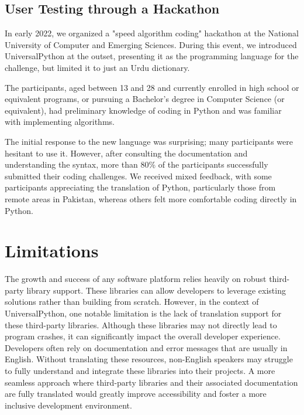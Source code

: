 \documentclass[conference]{IEEEtran}
\begin{document}
\subsection{User Testing through a Hackathon}

In early 2022, we organized a "speed algorithm coding" hackathon at the National University of Computer and Emerging Sciences. During this event, we introduced UniversalPython at the outset, presenting it as the programming language for the challenge, but limited it to just an Urdu dictionary.

The participants, aged between 13 and 28 and currently enrolled in high school or equivalent programs, or pursuing a Bachelor's degree in Computer Science (or equivalent), had preliminary knowledge of coding in Python and was familiar with implementing algorithms.

The initial response to the new language was surprising; many participants were hesitant to use it. However, after consulting the documentation and understanding the syntax, more than 80\% of the participants successfully submitted their coding challenges. We received mixed feedback, with some participants appreciating the translation of Python, particularly those from remote areas in Pakistan, whereas others felt more comfortable coding directly in Python.

\section{Limitations}

The growth and success of any software platform relies heavily on robust third-party library support. These libraries can allow developers to leverage existing solutions rather than building from scratch. However, in the context of UniversalPython, one notable limitation is the lack of translation support for these third-party libraries. Although these libraries may not directly lead to program crashes, it can significantly impact the overall developer experience. Developers often rely on documentation and error messages that are usually in English. Without translating these resources, non-English speakers may struggle to fully understand and integrate these libraries into their projects. A more seamless approach where third-party libraries and their associated documentation are fully translated would greatly improve accessibility and foster a more inclusive development environment.
\end{document}
